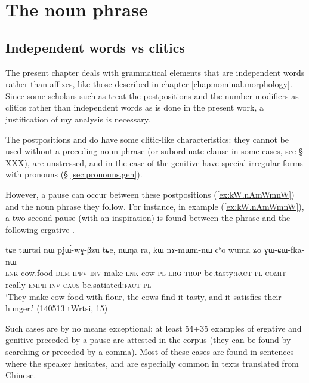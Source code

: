 \chapter{The noun phrase} \label{chap:noun.phrase}

\section{Independent words vs clitics}
The present chapter deals with grammatical elements that are independent words rather than affixes, like those described in chapter \ref{chap:nominal.morphology}. Since some scholars such as 
\citet{jackson98morphology, jackson14morpho} treat the postpositions and the number modifiers as clitics rather than independent words as is done in the present work, a justification of my analysis is necessary.

The postpositions  and   do have some clitic-like characteristics: they cannot be used without a preceding noun phrase (or subordinate clause in some cases, see § XXX), are unstressed, and in the case of the genitive have special irregular forms with pronouns (§ \ref{sec:pronouns.gen}).

However, a pause can occur between these postpositions (\ref{ex:kW.nAmWmnW}) and the noun phrase they follow. For instance, in example (\ref{ex:kW.nAmWmnW}), a two second pause (with an inspiration) is found between the phrase  and the following ergative . 

\begin{exe}
\ex \label{ex:kW.nAmWmnW}
\gll tɕe tɯrtsi nɯ pjɯ́-wɣ-βzu tɕe, nɯŋa ra, kɯ nɤ-mɯm-nɯ cʰo wuma ʑo ɣɯ-ɕɯ-fka-nɯ \\
\textsc{lnk} cow.food \textsc{dem} \textsc{ipfv}-\textsc{inv}-make \textsc{lnk} cow \textsc{pl} \textsc{erg} \textsc{trop}-be.tasty:\textsc{fact}-\textsc{pl} \textsc{comit} really \textsc{emph} \textsc{inv}-\textsc{caus}-be.satiated:\textsc{fact}-\textsc{pl} \\
\glt `They make cow food with flour, the cows find it tasty, and it satisfies their hunger.' (140513 tWrtsi, 15)
\end{exe}


Such cases are by no means exceptional; at least 54+35 examples of ergative and genitive preceded by a pause are attested in the corpus (they can be found by searching  or   preceded by a comma). Most of these cases are found in sentences where the speaker hesitates, and are especially common in texts translated from Chinese.

